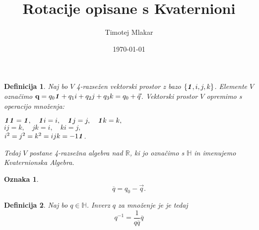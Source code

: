\documentclass{beamer}
\title{Rotacije opisane s Kvaternioni}
\author{Timotej Mlakar}
\institute{Fakulteta za matematiko in fiziko \\
Oddelek za matematiko}
\date{\today}
\def\R{\mathbb{R}} %
\def\H{\mathbb{H}} %
\def\1{\textbf{\emph{1}}}
\newcommand{\conj}[1]{\overline{#1}}
\newtheorem{definicija}{Definicija}
\newtheorem{oznaka}{Oznaka}
\begin{document}

\begin{frame}
\titlepage
\end{frame}


\begin{frame}
   \begin{definicija}
      Naj bo $V$ 4-razsežen vektorski prostor z bazo $\{\1, i, j, k\}$.
      Elemente $V$ označimo $\textbf{q} = q_{0}\1 + q_{1}i + q_{2}j + q_{3}k = q_{0} + \vec{q}$.
      Vektorski prostor $V$ opremimo s operacijo množenja:
      \begin{center}
         $\1 \1 = \1, \hspace{1em}  \1i = i, \hspace{1em} \1j = j, \hspace{1em} \1k = k,$\\
         $ij = k, \hspace{1em} jk = i, \hspace{1em} ki = j,$\\
         $i^2 = j^2 = k^2 = ijk = -1\1$.
      \end{center}
      Tedaj $V$ postane 4-razsežna algebra nad $\R$, ki jo označimo s $\H$ in imenujemo \emph{Kvaternionska Algebra}.
   \end{definicija}

\end{frame}


\begin{frame}
   \begin{oznaka}
      \[
      \conj{q} = q_{0} - \vec{q}.
      \]
   \end{oznaka}

   \pause
   \begin{definicija}
      Naj bo $q \in \H$. Inverz $q$ za množenje je je tedaj 
      \[
      q^{-1} = \dfrac{1}{q\conj{q}} \conj{q}   
      \]
   \end{definicija}
\end{frame}

\end{document}
